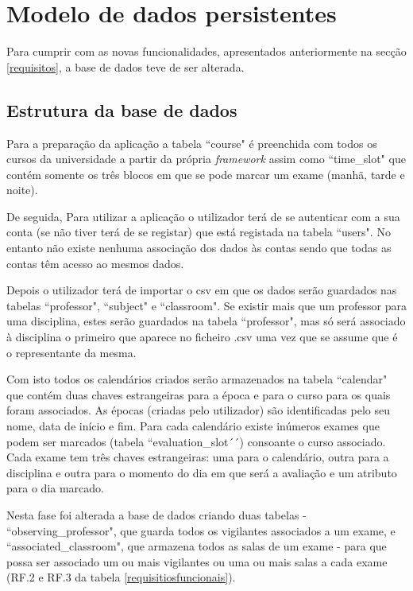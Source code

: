 \documentclass[12pt, twoside]{report}
\begin{document}
	

	
	
	\chapter{Modelo de dados persistentes}
	
		Para cumprir com as novas funcionalidades, apresentados anteriormente na secção \ref{requisitos}, a base de dados teve de ser alterada. 
	
	\section{Estrutura da base de dados}
	
	Para a preparação da aplicação a tabela ``course" é preenchida com todos os cursos da universidade a partir da própria \textit{framework} assim como ``time\_slot" que contém somente os três blocos em que se pode marcar um exame (manhã, tarde e noite).
	
	De seguida, Para utilizar a aplicação o utilizador terá de se autenticar com a sua conta (se não tiver terá de se registar) que está registada na tabela ``users". No entanto não existe nenhuma associação dos dados às contas sendo que todas as contas têm acesso ao mesmos dados.
	
	Depois o utilizador terá de importar o csv em que os dados serão guardados nas tabelas ``professor", ``subject" e ``classroom". Se existir mais que um professor para uma disciplina, estes serão guardados na tabela ``professor", mas só será associado à disciplina o primeiro que aparece no ficheiro .csv uma vez que se assume que é o representante da mesma.
	
	Com isto todos os calendários criados serão armazenados na tabela ``calendar" que contém duas chaves estrangeiras para a época e para o curso para os quais foram associados. As épocas (criadas pelo utilizador) são identificadas pelo seu nome, data de início e fim. Para cada calendário existe inúmeros exames que podem ser marcados (tabela ``evaluation\_slot´´) consoante o curso associado. Cada exame tem três chaves estrangeiras: uma para o calendário, outra para a disciplina e outra para o momento do dia em que será a avaliação e um atributo para o dia marcado.
	
	Nesta fase foi alterada a base de dados criando duas tabelas - ``observing\_professor", que guarda todos os vigilantes associados a um exame, e ``associated\_classroom", que armazena todos as salas de um exame - para que possa ser associado um ou mais vigilantes ou uma ou mais salas a cada exame (RF.2 e RF.3 da tabela \ref{requisitiosfuncionais}).
	
\end{document}
